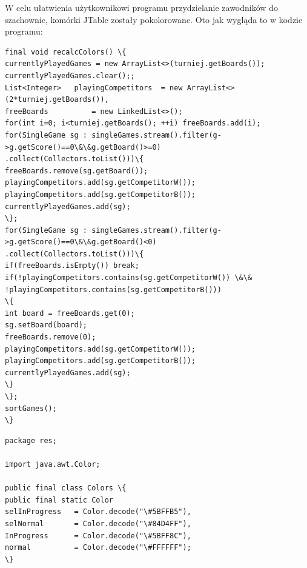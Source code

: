 W celu ułatwienia użytkownikowi programu przydzielanie zawodników do szachownic, komórki  JTable zostały pokolorowane. Oto jak wygląda to w kodzie programu:
\begin{verbatim}
final void recalcColors() \{
currentlyPlayedGames = new ArrayList<>(turniej.getBoards());
currentlyPlayedGames.clear();;
List<Integer> 	playingCompetitors 	= new ArrayList<>(2*turniej.getBoards()),
freeBoards 			= new LinkedList<>();
for(int i=0; i<turniej.getBoards(); ++i) freeBoards.add(i);
for(SingleGame sg : singleGames.stream().filter(g->g.getScore()==0\&\&g.getBoard()>=0)
.collect(Collectors.toList()))\{
freeBoards.remove(sg.getBoard());
playingCompetitors.add(sg.getCompetitorW());
playingCompetitors.add(sg.getCompetitorB());
currentlyPlayedGames.add(sg);
\};
for(SingleGame sg : singleGames.stream().filter(g->g.getScore()==0\&\&g.getBoard()<0)
.collect(Collectors.toList()))\{
if(freeBoards.isEmpty()) break;
if(!playingCompetitors.contains(sg.getCompetitorW()) \&\&
!playingCompetitors.contains(sg.getCompetitorB())) 
\{
int board = freeBoards.get(0);
sg.setBoard(board);
freeBoards.remove(0);
playingCompetitors.add(sg.getCompetitorW());
playingCompetitors.add(sg.getCompetitorB());
currentlyPlayedGames.add(sg);
\}	
\};
sortGames();
\}
\end{verbatim}
\begin{verbatim}
package res;

import java.awt.Color;

public final class Colors \{
public final static Color 
selInProgress 	= Color.decode("\#5BFFB5"),
selNormal		= Color.decode("\#84D4FF"),
InProgress		= Color.decode("\#5BFF8C"),
normal 			= Color.decode("\#FFFFFF");
\}
\end{verbatim}

